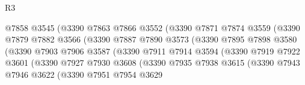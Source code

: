 \begin{lexlean}{R3}
\begin{coremodule}
                                  @7858
                                  @3545
                                  (@3390
                                    @7863
                                    @7866
                                    @3552
                                    (@3390
                                      @7871
                                      @7874
                                      @3559
                                      (@3390
                                        @7879
                                        @7882
                                        @3566
                                        (@3390
                                          @7887
                                          @7890
                                          @3573
                                          (@3390
                                            @7895
                                            @7898
                                            @3580
                                            (@3390
                                              @7903
                                              @7906
                                              @3587
                                              (@3390
                                                @7911
                                                @7914
                                                @3594
                                                (@3390
                                                  @7919
                                                  @7922
                                                  @3601
                                                  (@3390
                                                    @7927
                                                    @7930
                                                    @3608
                                                    (@3390
                                                      @7935
                                                      @7938
                                                      @3615
                                                      (@3390
                                                        @7943
                                                        @7946
                                                        @3622
                                                        (@3390
                                                          @7951
                                                          @7954
                                                          @3629

\end{coremodule}
\end{lexlean}
